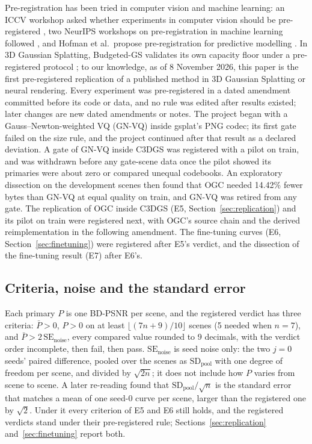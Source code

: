 Pre-registration has been tried in computer vision and machine learning: an ICCV workshop asked whether experiments in computer vision should be pre-registered \citep{iccv2019prereg}, two NeurIPS workshops on pre-registration in machine learning followed \citep{bertinetto2021prereg,albanie2022prereg}, and Hofman et al.\ propose pre-registration for predictive modelling \citep{hofman2023preregistration}.
In 3D Gaussian Splatting, Budgeted-GS validates its own capacity floor under a pre-registered protocol \citep{wang2026budgeted}; to our knowledge, as of 8 November 2026, this paper is the first pre-registered replication of a published method in 3D Gaussian Splatting or neural rendering.
Every experiment was pre-registered in a dated amendment committed before its code or data, and no rule was edited after results existed; later changes are new dated amendments or notes. %
The project began with a Gauss--Newton-weighted VQ (GN-VQ) inside gsplat's PNG codec; its first gate failed on the size rule, and the project continued after that result as a declared deviation. %
A gate of GN-VQ inside C3DGS was registered with a pilot on train, and was withdrawn before any gate-scene data once the pilot showed its primaries were about zero or compared unequal codebooks. %
An exploratory dissection on the development scenes then found that OGC needed 14.42\% fewer bytes than GN-VQ at equal quality on train, and GN-VQ was retired from any gate. %
The replication of OGC inside C3DGS (E5, Section~\ref{sec:replication}) and its pilot on train were registered next, with OGC's source chain and the derived reimplementation in the following amendment. %
The fine-tuning curves (E6, Section~\ref{sec:finetuning}) were registered after E5's verdict, and the dissection of the fine-tuning result (E7) after E6's. %

\subsection{Criteria, noise and the standard error}

Each primary $P$ is one BD-PSNR per scene, and the registered verdict has three criteria: $\bar P > 0$, $P > 0$ on at least $\lfloor (7n+9)/10 \rfloor$ scenes (5 needed when $n = 7$), and $\bar P > 2\,\mathrm{SE}_{\mathrm{noise}}$, every compared value rounded to 9 decimals, with the verdict order incomplete, then fail, then pass. %
$\mathrm{SE}_{\mathrm{noise}}$ is seed noise only: the two $j = 0$ seeds' paired difference, pooled over the scenes as $\mathrm{SD}_{\mathrm{pool}}$ with one degree of freedom per scene, and divided by $\sqrt{2n}$; it does not include how $P$ varies from scene to scene. %
A later re-reading found that $\mathrm{SD}_{\mathrm{pool}}/\sqrt{n}$ is the standard error that matches a mean of one seed-0 curve per scene, larger than the registered one by $\sqrt{2}$. %
Under it every criterion of E5 and E6 still holds, and the registered verdicts stand under their pre-registered rule; Sections~\ref{sec:replication} and~\ref{sec:finetuning} report both. %
